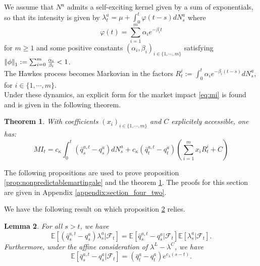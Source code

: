 \documentclass{article} %
\newtheorem{theorem}{Theorem}[section]
\newtheorem{lemma}[theorem]{Lemma}
\newcommand{\1}{\mathbbm{1}} %
\newcommand{\norm}[1]{{\vert\kern-0.25ex\vert #1 \vert\kern-0.25ex\vert}}
\newcommand{\E}{\mathbb{E}}
\begin{document}
\begin{as}
We assume that $N^a$ admits a self-exciting kernel given by a sum of exponentials, so that its intensity is given by
 $\lambda^a_t = \mu + \int_0^t \varphi(t-s)dN^a_s$ where 
 \begin{equation}
 \label{eq:kernel_sum_exps}
 \varphi(t) = \sum_{i=1}^m \alpha_i e^{-\beta_i t}
 \end{equation}
 for $m \ge 1$ and some positive constants $(\alpha_i,\beta_i)_{i \in \{1,\cdots, m\}}$ satisfying $\norm{\phi}_1 := \sum_{i=0}^m \frac{\alpha_i}{\beta_i} < 1$.\\
 The Hawkes process becomes Markovian in the factors $R^i_t := \int_0^t \alpha_i e^{-\beta_i (t-s)} dN^a_s$, for $i \in \{1,\cdots,m\}$.\\
Under these dynamics, an explicit form for the market impact \eqref{eq:mi} is found and is given in the following theorem.
\begin{theorem}
    \label{thm:explicit_impact_shape}
    With coefficients $(x_i)_{i \in \{1,\cdots,m\}}$ and $C$ explicitely accessible, one has:
    \begin{equation*}
        MI_t = c_{\kappa} \int_0^t (\bar{q}^{a,t}_s - q^{a}_s) dN^a_s + c_{\kappa} (\bar{q}^{a,t}_t - q^{a}_t)(\sum_{i=1}^m x_i R^i_t + C)
    \end{equation*}
\end{theorem}

The following propositions are used to prove proposition \ref{prop:nonpredictablemartingale} and the theorem \ref{thm:explicit_impact_shape}. The proofs for this section are given in Appendix \ref{appendix:section_four_two}.

We have the following result on which proposition \ref{lem:queue_independence} relies.
\begin{lemma}
    \label{lem:queue_independence}
    For all $s > t$, we have
    \begin{equation*}
    \E[(\bar{q}^{a,t}_s - q^a_s) \lambda^a_s | \mathcal{F}_t] = \E[\bar{q}^{a,t}_s - q^a_s | \mathcal{F}_t] \E[\lambda^a_s | \mathcal{F}_t].
    \end{equation*}
Furthermore, under the affine consideration of $\lambda^L - \lambda^C$, we have 
\begin{equation*}
    \E[\bar{q}^{a,t}_s - q^a_s | \mathcal{F}_t] = (\bar{q}^a_t - q^a_t) e^{c_{\lambda}(s-t)}.
\end{equation*}
\end{lemma}


\end{as}
\end{document}
